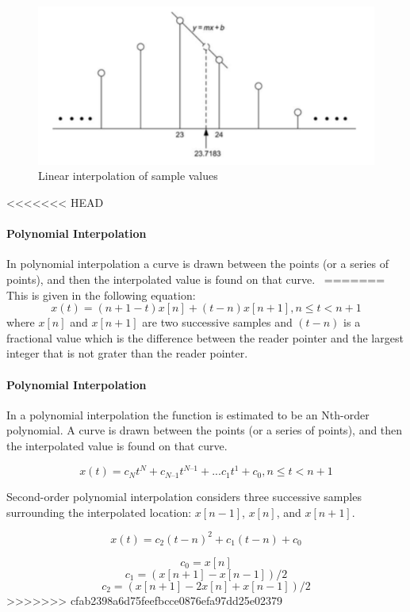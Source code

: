 \begin{figure}[h]
	\centering
  	\includegraphics[width=0.8\linewidth]{assets/Linear interpolation of sample values.png}
  	\caption{Linear interpolation of sample values}
  	\label{fig:linear-interpolation}
\end{figure}

<<<<<<< HEAD


\paragraph{Polynomial Interpolation}
In polynomial interpolation a curve is drawn between the points (or a series of points), and then the interpolated value is found on that curve.~\cite{pirkle2013designing}
=======
This is given in the following equation:
\[
 x(t) = (n + 1 - t)x[n] + (t-n)x[n+1], 				n \leq t< n + 1
\]
where $x[n]$ and $x[n+1]$ are two successive  samples and $ (t-n) $ is a fractional value which is the difference between the reader pointer and the largest integer that is not grater than the reader pointer.

\paragraph{Polynomial Interpolation}
In a polynomial interpolation the function is estimated to be an Nth-order polynomial. A curve is drawn between the points (or a series of points), and then the interpolated value is found on that curve.~\cite{pirkle2013designing}

\[
 x(t) = c_{N}t^{N} + c_{N–1}t^{N–1} + ... c_{1}t^{1} + c_{0}, 				n \leq t< n + 1
 \]

Second-order polynomial interpolation considers three successive samples surrounding the interpolated location: $x[n-1]$, $x[n]$, and $x[n+1]$. 

\[
x(t) = c_{2}(t-n)^{2} + c_{1}(t-n) + c_{0}
\]

\[
c_{0} = x[n]
\]
\[
c_{1} = (x[n+1] - x[n-1])/2
\]
\[
c_{2} = (x[n+1] - 2x[n] + x[n-1])/2
\]
>>>>>>> cfab2398a6d75feefbcce0876efa97dd25e02379



